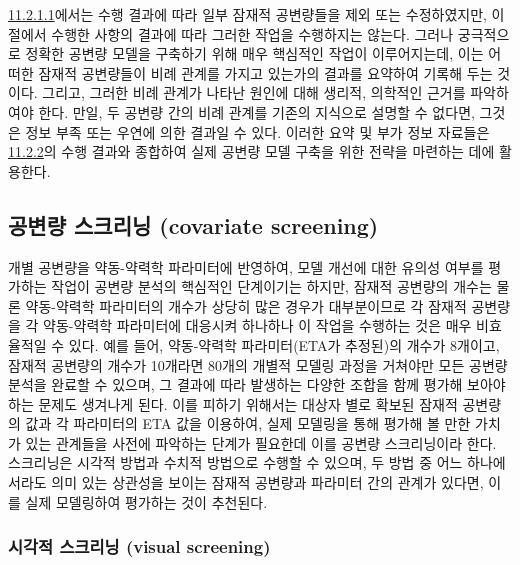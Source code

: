 \documentclass[
  10pt,
  krantz2,
  a4paper]{krantz}
\theoremstyle{definition}
\theoremstyle{definition}
\theoremstyle{definition}
\theoremstyle{remark}
\begin{document}
\protect\hyperlink{variable-eval}{11.2.1.1}에서는 수행 결과에 따라 일부 잠재적 공변량들을 제외 또는 수정하였지만, 이 절에서 수행한 사항의 결과에 따라 그러한 작업을 수행하지는 않는다. 그러나 궁극적으로 정확한 공변량 모델을 구축하기 위해 매우 핵심적인 작업이 이루어지는데, 이는 어떠한 잠재적 공변량들이 비례 관계를 가지고 있는가의 결과를 요약하여 기록해 두는 것이다. 그리고, 그러한 비례 관계가 나타난 원인에 대해 생리적, 의학적인 근거를 파악하여야 한다. 만일, 두 공변량 간의 비례 관계를 기존의 지식으로 설명할 수 없다면, 그것은 정보 부족 또는 우연에 의한 결과일 수 있다. 이러한 요약 및 부가 정보 자료들은 \protect\hyperlink{cov-screening}{11.2.2}의 수행 결과와 종합하여 실제 공변량 모델 구축을 위한 전략을 마련하는 데에 활용한다.

\hypertarget{cov-screening}{%
\subsection{공변량 스크리닝 (covariate screening)}\label{cov-screening}}

개별 공변량을 약동-약력학 파라미터에 반영하여, 모델 개선에 대한 유의성 여부를 평가하는 작업이 공변량 분석의 핵심적인 단계이기는 하지만, 잠재적 공변량의 개수는 물론 약동-약력학 파라미터의 개수가 상당히 많은 경우가 대부분이므로 각 잠재적 공변량을 각 약동-약력학 파라미터에 대응시켜 하나하나 이 작업을 수행하는 것은 매우 비효율적일 수 있다. 예를 들어, 약동-약력학 파라미터(ETA가 추정된)의 개수가 8개이고, 잠재적 공변량의 개수가 10개라면 80개의 개별적 모델링 과정을 거쳐야만 모든 공변량 분석을 완료할 수 있으며, 그 결과에 따라 발생하는 다양한 조합을 함께 평가해 보아야 하는 문제도 생겨나게 된다. 이를 피하기 위해서는 대상자 별로 확보된 잠재적 공변량의 값과 각 파라미터의 ETA 값을 이용하여, 실제 모델링을 통해 평가해 볼 만한 가치가 있는 관계들을 사전에 파악하는 단계가 필요한데 이를 공변량 스크리닝이라 한다. 스크리닝은 시각적 방법과 수치적 방법으로 수행할 수 있으며, 두 방법 중 어느 하나에서라도 의미 있는 상관성을 보이는 잠재적 공변량과 파라미터 간의 관계가 있다면, 이를 실제 모델링하여 평가하는 것이 추천된다.

\hypertarget{uxc2dcuxac01uxc801-uxc2a4uxd06cuxb9acuxb2dd-visual-screening}{%
\subsubsection{시각적 스크리닝 (visual screening)}\label{uxc2dcuxac01uxc801-uxc2a4uxd06cuxb9acuxb2dd-visual-screening}}

\end{document}
